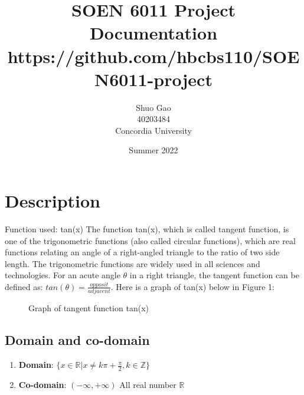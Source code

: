 \documentclass{article}
\title{SOEN 6011 Project Documentation \\
\large https://github.com/hbcbs110/SOEN6011-project}
\author{Shuo Gao \\ 40203484 \\ Concordia University}
\date{Summer 2022}
\begin{document}
\pagestyle{fancy}
\fancyhf{}
\maketitle
{}
\tableofcontents
\newpage
{}

\fancyfoot[C]{\thepage}
\section{Description}
Function used: tan(x)
The function tan(x), which is called tangent function, is one of the trigonometric functions (also called circular functions), which are real functions relating an angle of a right-angled triangle to the ratio of two side length. The trigonometric functions are widely used in all sciences and technologies. For an acute angle $\theta$ in a right triangle, the tangent function can be defined as: $tan(\theta)=\frac{opposit}{adjacent}$.\cite{enwiki:1101002187} Here is a graph of tan(x) below in Figure 1:

\begin{figure}[H]
\centering
{}
\caption{Graph of tangent function tan(x)}
\label{Fig.main}
\end{figure}

\subsection{Domain and co-domain}
\begin{enumerate}
    \item \textbf{Domain}: $\{x\in\mathbb{R}|x\ne k\pi+\frac{\pi}{2}, k\in\mathbb{Z}\}$
    \item \textbf{Co-domain}: $(-\infty, +\infty)$ All real number $\mathbb{R}$
\end{enumerate}
\end{document}
